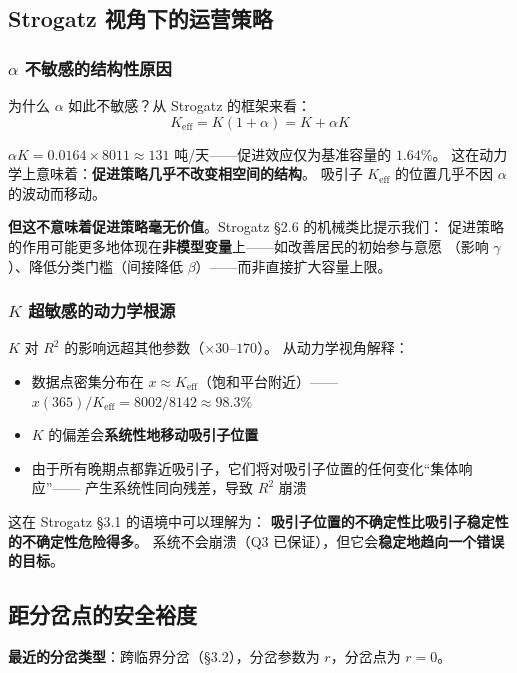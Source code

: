 \documentclass[12pt,a4paper]{article}
\begin{document}
\subsection{Strogatz 视角下的运营策略}

\subsubsection{$\alpha$ 不敏感的结构性原因}
为什么 $\alpha$ 如此不敏感？从 Strogatz 的框架来看：
\begin{equation}
K_{\text{eff}} = K(1+\alpha) = K + \alpha K
\end{equation}

$\alpha K = 0.0164 \times 8011 \approx 131$ 吨/天——促进效应仅为基准容量的 $1.64\%$。
这在动力学上意味着：\textbf{促进策略几乎不改变相空间的结构}。
吸引子 $K_{\text{eff}}$ 的位置几乎不因 $\alpha$ 的波动而移动。

\textbf{但这不意味着促进策略毫无价值}。Strogatz \S2.6 的机械类比提示我们：
促进策略的作用可能更多地体现在\textbf{非模型变量}上——如改善居民的初始参与意愿
（影响 $\gamma$）、降低分类门槛（间接降低 $\beta$）——而非直接扩大容量上限。

\subsubsection{$K$ 超敏感的动力学根源}
$K$ 对 $R^2$ 的影响远超其他参数（$\times 30$--$170$）。
从动力学视角解释：
\begin{itemize}
  \item 数据点密集分布在 $x \approx K_{\text{eff}}$（饱和平台附近）——
        $x(365) / K_{\text{eff}} = 8002 / 8142 \approx 98.3\%$
  \item $K$ 的偏差会\textbf{系统性地移动吸引子位置}
  \item 由于所有晚期点都靠近吸引子，它们将对吸引子位置的任何变化``集体响应''——
        产生系统性同向残差，导致 $R^2$ 崩溃
\end{itemize}

这在 Strogatz \S3.1 的语境中可以理解为：
\textbf{吸引子位置的不确定性比吸引子稳定性的不确定性危险得多}。
系统不会崩溃（Q3 已保证），但它会\textbf{稳定地趋向一个错误的目标}。

\subsection{距分岔点的安全裕度}

\textbf{最近的分岔类型}：跨临界分岔（\S3.2），分岔参数为 $r$，分岔点为 $r = 0$。
\end{document}

